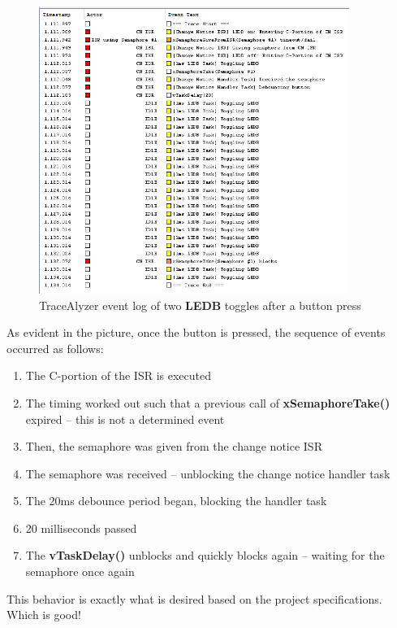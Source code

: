 \documentclass[a4paper, 12pt]{article}
\begin{document}
\begin{figure}[H]
\centering
\includegraphics[width=0.9\textwidth]{pic-tracealyzer-button-press.PNG}
\caption{TraceAlyzer event log of two \textbf{LEDB} toggles after a button press}
\label{fig:pic-tracealyzer-button-press}
\end{figure}

As evident in the picture, once the button is pressed, the sequence of events occurred as follows: 

\begin{enumerate}
\item The C-portion of the ISR is executed
\item The timing worked out such that a previous call of \textbf{xSemaphoreTake()} expired -- this is not a determined event
\item Then, the semaphore was given from the change notice ISR
\item The semaphore was received -- unblocking the change notice handler task
\item The 20ms debounce period began, blocking the handler task
\item 20 milliseconds passed
\item The \textbf{vTaskDelay()} unblocks and quickly blocks again -- waiting for the semaphore once again
\end{enumerate}

This behavior is exactly what is desired based on the project specifications. Which is good!
\end{document}
